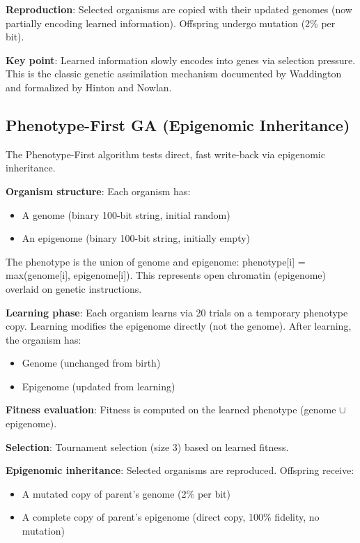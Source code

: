 \documentclass[twocolumn]{article}
\begin{document}
\textbf{Reproduction}: Selected organisms are copied with their updated genomes (now partially encoding learned information). Offspring undergo mutation (2\% per bit).

\textbf{Key point}: Learned information slowly encodes into genes via selection pressure. This is the classic genetic assimilation mechanism documented by Waddington and formalized by Hinton and Nowlan.

\subsection*{Phenotype-First GA (Epigenomic Inheritance)}

The Phenotype-First algorithm tests direct, fast write-back via epigenomic inheritance.

\textbf{Organism structure}: Each organism has:
\begin{itemize}
\item A genome (binary 100-bit string, initial random)
\item An epigenome (binary 100-bit string, initially empty)
\end{itemize}

The phenotype is the union of genome and epigenome: phenotype[i] = max(genome[i], epigenome[i]). This represents open chromatin (epigenome) overlaid on genetic instructions.

\textbf{Learning phase}: Each organism learns via 20 trials on a temporary phenotype copy. Learning modifies the epigenome directly (not the genome). After learning, the organism has:
\begin{itemize}
\item Genome (unchanged from birth)
\item Epigenome (updated from learning)
\end{itemize}

\textbf{Fitness evaluation}: Fitness is computed on the learned phenotype (genome $\cup$ epigenome).

\textbf{Selection}: Tournament selection (size 3) based on learned fitness.

\textbf{Epigenomic inheritance}: Selected organisms are reproduced. Offspring receive:
\begin{itemize}
\item A mutated copy of parent's genome (2\% per bit)
\item A complete copy of parent's epigenome (direct copy, 100\% fidelity, no mutation)
\end{itemize}
\end{document}

